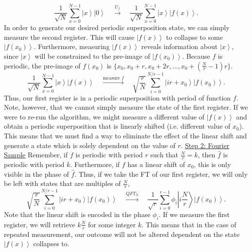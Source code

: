 \documentclass[11pt]{article} %
\newcommand{\ket}[1]{\left|#1\right\rangle}
\begin{document}
\begin{equation*}
    \frac{1}{\sqrt{N}}\sum_{x=0}^{N-1}\ket{x}\ket{0} \quad \overset{U_f}{\longrightarrow} \quad \frac{1}{\sqrt{N}}\sum_{x=0}^{N-1}\ket{x}\ket{f(x)} .
\end{equation*}
\newline\newline
In order to generate our desired periodic superposition state, we can simply measure the second register. This will cause $\ket{f(x)}$ to collapse to some $\ket{f(x_0)}$. Furthermore, measuring $\ket{f(x)}$ reveals information about $\ket{x}$, since $\ket{x}$ will be constrained to the pre-image of $\ket{f(x_0)}$. Because $f$ is periodic, the pre-image of $f(x_0)$ is $\{x_0, x_0+r, x_0+2r, ..., x_0+(\frac{N}{r}-1)r \}$. 
\begin{equation*}
    \frac{1}{\sqrt{N}}\sum_{x=0}^{N-1}\ket{x}\ket{f(x)} \quad \overset{\text{measure }f}{\longrightarrow} \quad  
    \sqrt{\frac{r}{N}}\sum_{i=0}^{N/r-1}\ket{ir+x_0}\ket{f(x_0)}.
\end{equation*}
Thus, our first register is in a periodic superposition with period of function $f$. Note, however, that we cannot simply measure the state of the first register. If we were to re-run the algorithm, we might measure a different value of $\ket{f(x)}$ and obtain a periodic superposition that is linearly shifted (i.e. different value of $x_0$). This means that we must find a way to eliminate the effect of the linear shift and generate a state which is solely dependent on the value of $r$.
\newline\newline
\underline{Step 2: Fourier Sample}
\newline\newline
Remember, if $f$ is periodic with period $r$ such that $\frac{N}{r}=k$, then $\hat{f}$ is periodic with period $k$. Furthermore, if $f$ has a linear shift of $x_0$, this is only visible in the phase of $\hat{f}$. Thus, if we take the FT of our first register, we will only be left with states that are multiples of $\frac{N}{r}$,
\begin{equation*}
    \sqrt{\frac{r}{N}}\sum_{i=0}^{N/r-1}\ket{ir+x_0}\ket{f(x_0)} 
    \quad \overset{QFT_N}{\longrightarrow} \quad 
    \frac{1}{\sqrt{r}}\sum_{i=0}^{r-1}\phi_i\ket{i\frac{N}{r}}\ket{f(x_0)}. 
\end{equation*}
Note that the linear shift is encoded in the phase $\phi_i$. If we measure the first register, we will retrieve $k\frac{N}{r}$ for some integer $k$. This means that in the case of repeated measurement, our outcome will not be altered dependent on the state $\ket{f(x)}$ collapses to.
\end{document}
